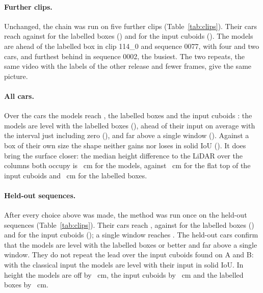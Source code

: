 \documentclass[runningheads,a4paper]{llncs}
\begin{document}


\paragraph{Further clips.} Unchanged, the chain was run on five further clips (Table~\ref{tab:clips}). Their
\ClsFCars{} cars reach \ClsFOurs{} against \ClsFLab{} for the labelled boxes (\ClsFDLab{}) and \ClsFInput{} for the
input cuboids (\ClsFDInput{}). The models are ahead of the labelled box in clip 114\_0 and sequence 0077, with four
and two cars, and furthest behind in sequence 0002, the busiest. The two repeats, the same video with the labels of
the other release and fewer frames, give the same picture.

\paragraph{All cars.} Over the \ClsTCars{} cars the models reach \ClsTOurs{}, the labelled boxes \ClsTLab{} and
the input cuboids \ClsTInput{}: the models are level with the labelled boxes (\ClsTDLab{}), ahead of their input
on average with the interval just including zero (\ClsTDInput{}), and far above a single window (\ClsTDSingle{}).
Against a box of their own size the shape neither gains nor loses in solid IoU (\ClsTDOwn{}). It does bring the
surface closer: the median height difference to the LiDAR over the columns both occupy is \ClsTFieldErr{}~cm for
the models, against \ClsTInputFieldErr{}~cm for the flat top of the input cuboids and \ClsTLabFieldErr{}~cm for the
labelled boxes.

\paragraph{Held-out sequences.} After every choice above was made, the method was run once on the \ClsHClips{}
held-out sequences (Table~\ref{tab:clips}). Their \ClsHCars{} cars reach \ClsHOurs{}, against \ClsHLab{} for the
labelled boxes (\ClsHDLab{}) and \ClsHInput{} for the input cuboids (\ClsHDInput{}); a single window reaches
\ClsHSingle{}. The held-out cars confirm that the models are level with the labelled boxes or better and far above
a single window. They do not repeat the lead over the input cuboids found on A and B: with the classical input the
models are level with their input in solid IoU. In height the models are off by \ClsHFieldErr{}~cm, the input
cuboids by \ClsHInputFieldErr{}~cm and the labelled boxes by \ClsHLabFieldErr{}~cm.
\end{document}
